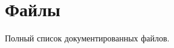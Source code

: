 \section{Файлы}
Полный список документированных файлов.\begin{DoxyCompactList}
\item{}
\item{}
\end{DoxyCompactList}
